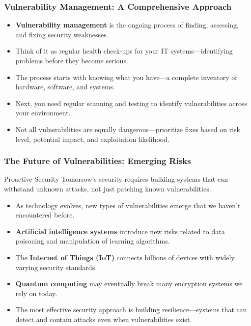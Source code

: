 \documentclass{beamer}
\begin{document}
\begin{frame}
    \frametitle{Vulnerability Management: A Comprehensive Approach}
    
    \begin{itemize}
        \item \textbf{Vulnerability management} is the ongoing process of finding, assessing, and fixing security weaknesses.
        \item Think of it as regular health check-ups for your IT systems—identifying problems before they become serious.
        \item The process starts with knowing what you have—a complete inventory of hardware, software, and systems.
        \item Next, you need regular scanning and testing to identify vulnerabilities across your environment.
        \item Not all vulnerabilities are equally dangerous—prioritize fixes based on risk level, potential impact, and exploitation likelihood.
    \end{itemize}
\end{frame}

\begin{frame}
    \frametitle{The Future of Vulnerabilities: Emerging Risks}
    
    \begin{block}{Proactive Security}
        Tomorrow's security requires building systems that can withstand unknown attacks, not just patching known vulnerabilities.
    \end{block}
    
    \begin{itemize}
        \item As technology evolves, new types of vulnerabilities emerge that we haven't encountered before.
        \item \textbf{Artificial intelligence systems} introduce new risks related to data poisoning and manipulation of learning algorithms.
        \item The \textbf{Internet of Things (IoT)} connects billions of devices with widely varying security standards.
        \item \textbf{Quantum computing} may eventually break many encryption systems we rely on today.
        \item The most effective security approach is building resilience—systems that can detect and contain attacks even when vulnerabilities exist.
    \end{itemize}
\end{frame}
\end{document}
